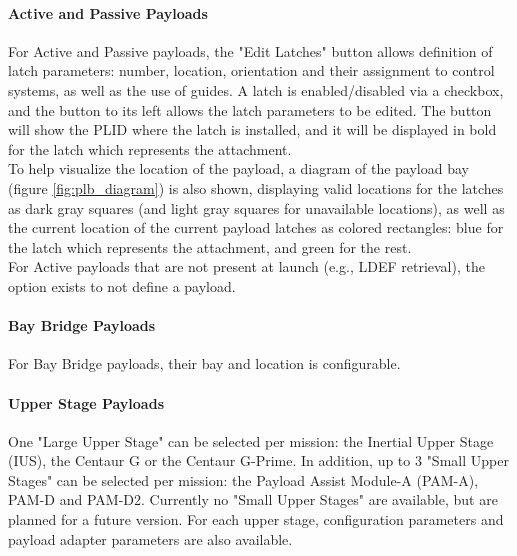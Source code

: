 \documentclass[Space_Shuttle_Vessel_Manual.tex]{subfiles}
\begin{document}
\begin{multicols*}{2}
\paragraph{Active and Passive Payloads}
For Active and Passive payloads, the "Edit Latches" button allows definition of latch parameters: number, location, orientation and their assignment to control systems, as well as the use of guides. A latch is enabled/disabled via a checkbox, and the button to its left allows the latch parameters to be edited. The button will show the PLID where the latch is installed, and it will be displayed in bold for the latch which represents the attachment.\\
To help visualize the location of the payload, a diagram of the payload bay (figure \ref{fig:plb_diagram}) is also shown, displaying valid locations for the latches as dark gray squares (and light gray squares for unavailable locations), as well as the current location of the current payload latches as colored rectangles: blue for the latch which represents the attachment, and green for the rest.\\
For Active payloads that are not present at launch (e.g., LDEF retrieval), the option exists to not define a payload.

\paragraph{Bay Bridge Payloads}
For Bay Bridge payloads, their bay and location is configurable.

\paragraph{Upper Stage Payloads}
One "Large Upper Stage" can be selected per mission: the Inertial Upper Stage (IUS), the Centaur G or the Centaur G-Prime. In addition, up to 3 "Small Upper Stages" can be selected per mission: the Payload Assist Module-A (PAM-A), PAM-D and PAM-D2. Currently no "Small Upper Stages" are available, but are planned for a future version. For each upper stage, configuration parameters and payload adapter parameters are also available.


\end{multicols*}
\end{document}
